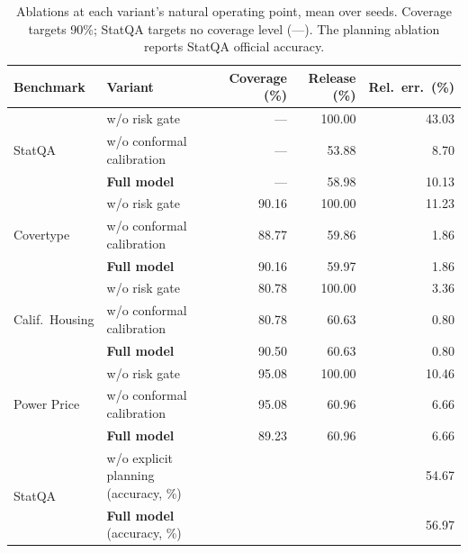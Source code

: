 \documentclass[preprint,12pt,authoryear]{elsarticle}
\begin{document}
\begin{table}[t]
    \centering
    \caption{Ablations at each variant's natural operating point, mean over seeds. Coverage targets 90\%; StatQA targets no coverage level (---). The planning ablation reports StatQA official accuracy.}
    \label{tab:ablation_results}
    \scriptsize
    \setlength{\tabcolsep}{4pt}
    \renewcommand{\arraystretch}{1.12}
    \begin{tabular}{@{}llrrr@{}}
        \toprule
        \textbf{Benchmark} & \textbf{Variant} & \textbf{Coverage (\%)} & \textbf{Release (\%)} & \textbf{Rel.\ err.\ (\%)} \\
        \midrule
        \multirow{3}{*}{StatQA}
        & w/o risk gate              & ---   & 100.00 & 43.03 \\
        & w/o conformal calibration  & ---   &  53.88 &  8.70 \\
        & \textbf{Full model}        & ---   &  58.98 &  10.13 \\
        \midrule
        \multirow{3}{*}{Covertype}
        & w/o risk gate              & 90.16 & 100.00 & 11.23 \\
        & w/o conformal calibration  & 88.77 &  59.86 &  1.86 \\
        & \textbf{Full model}        & 90.16 &  59.97 &  1.86 \\
        \midrule
        \multirow{3}{*}{Calif.\ Housing}
        & w/o risk gate              & 80.78 & 100.00 &  3.36 \\
        & w/o conformal calibration  & 80.78 &  60.63 &  0.80 \\
        & \textbf{Full model}        & 90.50 &  60.63 &  0.80 \\
        \midrule
        \multirow{3}{*}{Power Price}
        & w/o risk gate              & 95.08 & 100.00 & 10.46 \\
        & w/o conformal calibration  & 95.08 &  60.96 &  6.66 \\
        & \textbf{Full model}        & 89.23 &  60.96 &  6.66 \\
        \midrule
        \multirow{2}{*}{StatQA}
        & w/o explicit planning (accuracy, \%) & \multicolumn{3}{r}{54.67} \\
        & \textbf{Full model} (accuracy, \%)   & \multicolumn{3}{r}{56.97} \\
        \bottomrule
    \end{tabular}
\end{table}
\end{document}

